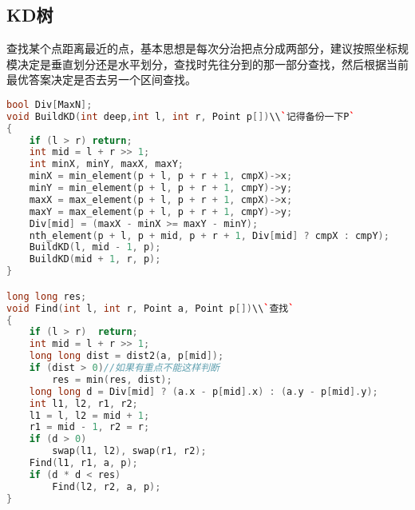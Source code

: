 \subsection{KD树}
	查找某个点距离最近的点，基本思想是每次分治把点分成两部分，建议按照坐标规模决定是垂直划分还是水平划分，查找时先往分到的那一部分查找，然后根据当前最优答案决定是否去另一个区间查找。
	\begin{lstlisting}[language=c++]
bool Div[MaxN];
void BuildKD(int deep,int l, int r, Point p[])\\`记得备份一下P`
{
	if (l > r) return;
	int mid = l + r >> 1;
	int minX, minY, maxX, maxY;
	minX = min_element(p + l, p + r + 1, cmpX)->x;
	minY = min_element(p + l, p + r + 1, cmpY)->y;
	maxX = max_element(p + l, p + r + 1, cmpX)->x;
	maxY = max_element(p + l, p + r + 1, cmpY)->y;
	Div[mid] = (maxX - minX >= maxY - minY);
	nth_element(p + l, p + mid, p + r + 1, Div[mid] ? cmpX : cmpY);
	BuildKD(l, mid - 1, p);
	BuildKD(mid + 1, r, p);
}

long long res;
void Find(int l, int r, Point a, Point p[])\\`查找`
{
	if (l > r)  return;
	int mid = l + r >> 1;
	long long dist = dist2(a, p[mid]);
	if (dist > 0)//如果有重点不能这样判断
		res = min(res, dist);
	long long d = Div[mid] ? (a.x - p[mid].x) : (a.y - p[mid].y);
	int l1, l2, r1, r2;
	l1 = l, l2 = mid + 1;
	r1 = mid - 1, r2 = r;
	if (d > 0)
		swap(l1, l2), swap(r1, r2);
	Find(l1, r1, a, p);
	if (d * d < res)
		Find(l2, r2, a, p);
}
	\end{lstlisting}
